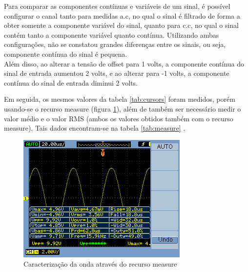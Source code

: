 \documentclass[a4paper]{article} %
\begin{document}
\begin{enumerate}
\begin{table}[h]
\end{table}

Para comparar as componentes contínuas e variáveis de um sinal, é possível configurar o canal tanto para medidas a.c, no qual o sinal é filtrado de forma a obter somente a componente variável do sinal, quanto para c.c, no qual o sinal contém tanto a componente variável quanto contínua. Utilizando ambas configurações, não se constatou grandes diferenças entre os sinais, ou seja, componente contínua do sinal é pequena. \\
Além disso, ao alterar a tensão de offset para 1 volts, a componente contínua do sinal de entrada aumentou 2 volts, e ao alterar para -1 volts, a componente contínua do sinal de entrada diminui 2 volts. 

Em seguida, os mesmos valores da tabela \ref{tab:cursors} foram medidos, porém usando-se o recurso measure (figura \ref{fig:Fig-1}), além de também ser necessário medir o valor médio e o valor RMS (ambos os valores obtidos também com o recurso measure). Tais dados encontram-se na tabela \ref{tab:measure} .\\ 

\begin{figure}[h!]
\begin{centering}
\includegraphics[scale=0.7]{Imagens/1}\caption{Caracterização da onda através do recurso measure \label{fig:Fig-1}}
\par\end{centering}
\end{figure}


\end{enumerate}
\end{document}
